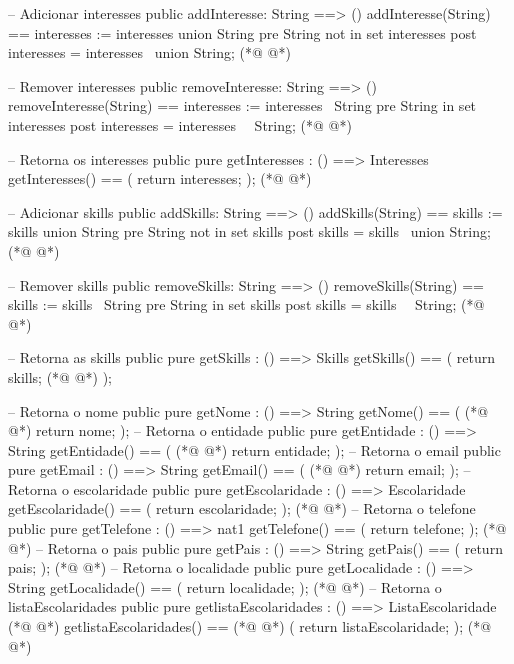 \begin{vdmpp}[breaklines=true]
 -- Adicionar interesses
 public addInteresse: String ==> ()
 addInteresse(String) == interesses := interesses union {String}
 pre String not in set interesses
 post interesses = interesses~ union {String};
(*@
\label{removeSkills:74}
@*)
 
 -- Remover interesses
 public removeInteresse: String ==> ()
 removeInteresse(String) == interesses := interesses \ {String}
 pre String in set interesses
 post interesses = interesses~ \ {String};
(*@
\label{getSkills:80}
@*)
 
 -- Retorna os interesses
 public pure getInteresses : () ==> Interesses
 getInteresses() ==
 (
  return interesses;
 );
(*@
\label{getNome:87}
@*)
 
 -- Adicionar skills
 public addSkills: String ==> ()
 addSkills(String) == skills := skills union {String}
 pre String not in set skills
 post skills = skills~ union {String};
(*@
\label{getEntidade:93}
@*)
 
 -- Remover skills
 public removeSkills: String ==> ()
 removeSkills(String) == skills := skills \ {String}
 pre String in set skills
 post skills = skills~ \ {String};
(*@
\label{getEmail:99}
@*)
 
 -- Retorna as skills
 public pure getSkills : () ==> Skills
 getSkills() ==
 (
  return skills;
(*@
\label{getEscolaridade:105}
@*)
 );
 
 -- Retorna o nome
 public pure getNome : () ==> String
 getNome() ==
 (
(*@
\label{getTelefone:111}
@*)
  return nome;
 );
 -- Retorna o entidade
 public pure getEntidade : () ==> String
 getEntidade() ==
 (
(*@
\label{getPais:117}
@*)
  return entidade;
 );
 -- Retorna o email
 public pure getEmail : () ==> String
 getEmail() ==
 (
(*@
\label{getLocalidade:123}
@*)
  return email;
 );
 -- Retorna o escolaridade
 public pure getEscolaridade : () ==> Escolaridade
 getEscolaridade() ==
 (
  return escolaridade;
 );
(*@
\label{setNome:131}
@*)
 -- Retorna o telefone
 public pure getTelefone : () ==> nat1
 getTelefone() ==
 (
  return telefone;
 );
(*@
\label{setEntidade:137}
@*)
 -- Retorna o pais
 public pure getPais : () ==> String
 getPais() ==
 (
  return pais;
 );
(*@
\label{setEmail:143}
@*)
 -- Retorna o localidade
 public pure getLocalidade : () ==> String
 getLocalidade() ==
 (
  return localidade;
 );
(*@
\label{setTelefone:149}
@*)
 -- Retorna o listaEscolaridades
 public pure getlistaEscolaridades : () ==> ListaEscolaridade
(*@
\label{getlistaEscolaridades:151}
@*)
 getlistaEscolaridades() ==
(*@
\label{getMapEscolaridades:152}
@*)
 (
  return listaEscolaridade;
 );
(*@
\label{setPais:155}
@*)
 

\end{vdmpp}
